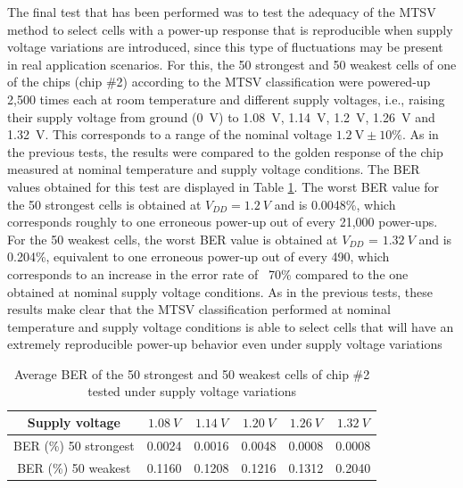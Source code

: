 The final test that has been performed was to test the adequacy of the MTSV method to select cells with a power-up response that is reproducible when supply voltage variations are introduced, since this type of fluctuations may be present in real application scenarios. For this, the 50 strongest and 50 weakest cells of one of the chips (chip \#2) according to the MTSV classification were powered-up 2,500 times each at room temperature and different supply voltages, i.e., raising their supply voltage from ground (\SI{0}{V}) to \SI{1.08}{V}, \SI{1.14}{V}, \SI{1.2}{V}, \SI{1.26}{V} and \SI{1.32}{V}. This corresponds to a range of the nominal voltage $1.2 \ \mathrm{V} \pm 10\%$. As in the previous tests, the results were compared to the golden response of the chip measured at nominal temperature and supply voltage conditions. The BER values obtained for this test are displayed in Table \ref{tab:vdd_ave_BER}. The worst BER value for the 50 strongest cells is obtained at $V_{DD} = \SI{1.2}{V}$ and is 0.0048\%, which corresponds roughly to one erroneous power-up out of every 21,000 power-ups. For the 50 weakest cells, the worst BER value is obtained at $V_{DD}$ = $\SI{1.32}{V}$ and is 0.204\%, 
equivalent to one erroneous power-up out of every 490, which corresponds to an increase in the error rate of ~70\% compared to the one obtained at nominal supply voltage conditions. As in the previous tests, these results make clear that the MTSV classification performed at nominal temperature and supply voltage conditions is able to select cells that will have an extremely reproducible power-up behavior even under supply voltage variations


\begin{table}[H]
  \centering
  \caption{Average BER of the 50 strongest and 50 weakest cells of chip \#2 tested under supply voltage variations}
  \vspace{5mm}
    \begin{tabular}{|c|c|c|c|c|c|}
    \hline
     Supply voltage & $\SI{1.08}{V}$ & $\SI{1.14}{V}$ & $\SI{1.20}{V}$ & $\SI{1.26}{V}$ & $\SI{1.32}{V}$ \bigstrut\\
    \hline
    BER (\%) 50 strongest & 0.0024 & 0.0016 & 0.0048 & 0.0008 & 0.0008\bigstrut\\
    \hline
    BER (\%) 50 weakest & 0.1160 & 0.1208 & 0.1216 & 0.1312 & 0.2040 \bigstrut\\
    \hline
    \end{tabular}%
  \label{tab:vdd_ave_BER}%
\end{table}%


